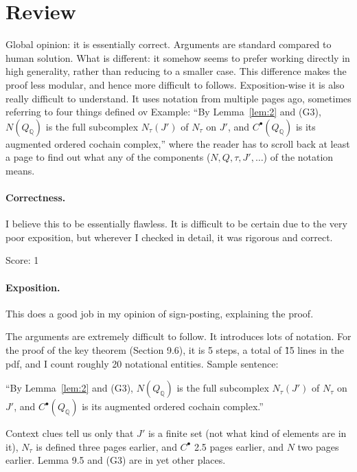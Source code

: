 \documentclass[11pt]{article}
\theoremstyle{definition}
\theoremstyle{remark}
\newcommand{\QQ}{\mathbb{Q}}
\newcommand{\Qrat}{Q_{\QQ}}
\begin{document}
\maketitle

\section{Review}

Global opinion: it is essentially correct. Arguments are standard compared to human solution. What is different: it somehow seems to prefer working directly in high generality, rather than reducing to a smaller case. This difference makes the proof less modular, and hence more difficult to follows.
Exposition-wise it is also really difficult to understand. It uses notation from multiple pages ago, sometimes referring to four things defined ov Example: ``By Lemma~\ref{lem:2} and (G3), $N(\Qrat)$ is the full subcomplex $N_\tau(J')$ of $N_\tau$ on $J'$, and $C^\bullet(\Qrat)$ is its augmented ordered cochain complex,'' where the reader has to scroll back at least a page to find out what any of the components ($N, Q, \tau, J', \dots$) of the notation means.

\paragraph{Correctness.}
I believe this to be essentially flawless. It is difficult to be certain due to the very poor exposition, but wherever I checked in detail, it was rigorous and correct.

\noindent Score: 1

\paragraph{Exposition.}
This does a good job in my opinion of sign-posting, explaining the proof.

The arguments are extremely difficult to follow. It introduces lots of notation. For the proof of the key theorem (Section 9.6), it is 5 steps, a total of \~15 lines in the pdf, and I count roughly 20 notational entities. Sample sentence: 

``By Lemma~\ref{lem:2} and (G3), $N(\Qrat)$ is the full subcomplex $N_\tau(J')$ of $N_\tau$ on $J'$, and $C^\bullet(\Qrat)$ is its augmented ordered cochain complex.''

Context clues tell us only that $J'$ is a finite set (not what kind of elements are in it), $N_\tau$ is defined three pages earlier, and $C^\bullet$ 2.5 pages earlier, and $N$ two pages earlier. Lemma 9.5 and (G3) are in yet other places.
\end{document}
